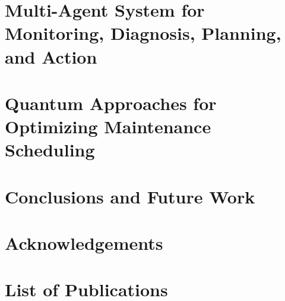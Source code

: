 \documentclass[11pt]{report}
\begin{document}
\chapter{Multi-Agent System for Monitoring, Diagnosis, Planning, and Action}
\label{chap:agentic}


\chapter{Quantum Approaches for Optimizing Maintenance Scheduling}
\label{chap:quantum}


\chapter{Conclusions and Future Work}
\label{chap:conclusion}


\newpage




\newpage
\chapter*{Acknowledgements}


\newpage
\chapter*{List of Publications}

\end{document}
